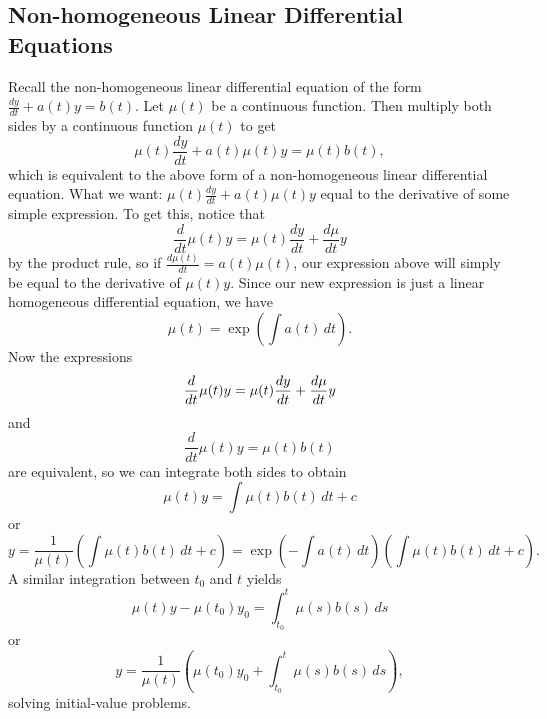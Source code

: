 \subsection{Non-homogeneous Linear Differential Equations}
Recall the non-homogeneous linear differential equation of the form $\frac{dy}{dt}+a(t)y=b(t)$. Let $\mu(t)$ be a continuous function. Then multiply both sides by a continuous function $\mu(t)$ to get \[
    \mu(t)\frac{dy}{dt}+a(t)\mu(t)y=\mu(t)b(t),
\]
which is equivalent to the above form of a non-homogeneous linear differential equation. What we want: $\mu(t)\frac{dy}{dt}+a(t)\mu(t)y$ equal to the derivative of some simple expression. To get this, notice that \[
    \frac{d}{dt} \mu(t)y=\mu(t)\frac{dy}{dt}+\frac{d\mu}{dt}y
\]
by the product rule, so if $\frac{d\mu(t)}{dt}=a(t)\mu(t)$, our expression above will simply be equal to the derivative of $\mu(t)y$. Since our new expression is just a linear homogeneous differential equation, we have \[
    \mu(t)=\exp\left( \int a(t) \, dt \right) .
\]
Now the expressions \[
    \frac{d}{dt} \mu(t)y=\mu(t)\frac{dy}{dt}+\frac{d\mu}{dt}y \\
\] and \[
\frac{d}{dt} \mu(t)y=\mu(t)b(t)
\]
are equivalent, so we can integrate both sides to obtain \[
    \mu(t)y=\int \mu(t)b(t) \, dt+c
\]
or \[
    y=\frac{1}{\mu(t)}\left( \int \mu(t)b(t) \, dt +c\right)=\exp\left( -\int a(t) \, dt \right) \left( \int \mu(t)b(t) \, dt+c \right) .
\]
A similar integration between $t_0$ and $t$ yields \[
    \mu(t)y-\mu(t_0)y_0=\int_{t_0}^{t} \mu(s)b(s) \, ds
\] or \[
y=\frac{1}{\mu(t)}\left( \mu(t_0)y_0+\int_{t_0}^{t} \mu(s)b(s) \, ds \right),
\]
solving initial-value problems. 
